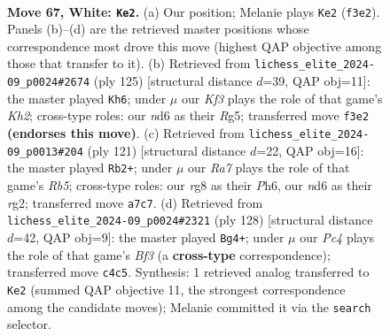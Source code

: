 \documentclass[11pt]{article}
\begin{document}
\clearpage

\begin{figure}[p]\centering
\begin{subfigure}{0.46\textwidth}\centering
\resizebox{\linewidth}{!}{%
\newchessgame
\chessboard[
  setfen={3k2r1/R6p/P2n4/8/2P5/2p2K1P/2P3P1/5B2 w - - 3 67},
  showmover=false,
  pgfstyle=straightmove, color=movearrow, markmove={f3-e2}
]}
\caption{}
\end{subfigure}\hfill
\begin{subfigure}{0.46\textwidth}\centering
\resizebox{\linewidth}{!}{%
\newchessgame
\chessboard[
  setfen={5K2/6pk/5p2/5Prp/1p2R3/1P6/8/8 b - - 0 63},
  showmover=false,
  pgfstyle=straightmove, color=movearrow, markmove={h7-h6}
]}
\caption{}
\end{subfigure}
\\[4pt]
\begin{subfigure}{0.46\textwidth}\centering
\resizebox{\linewidth}{!}{%
\newchessgame
\chessboard[
  setfen={8/8/1k3p1p/1p2bP1P/1r2p3/6p1/2K1N1R1/8 b - - 1 61},
  showmover=false,
  pgfstyle=straightmove, color=movearrow, markmove={b4-b2}
]}
\caption{}
\end{subfigure}\hfill
\begin{subfigure}{0.46\textwidth}\centering
\resizebox{\linewidth}{!}{%
\newchessgame
\chessboard[
  setfen={8/8/3p4/1P1P1kn1/2P4R/5B1p/r7/5K2 w - - 6 65},
  showmover=false,
  pgfstyle=straightmove, color=movearrow, markmove={f3-g4}
]}
\caption{}
\end{subfigure}
\caption{\textbf{Move 67, White: \texttt{Ke2}.} (a) Our position; Melanie plays \texttt{Ke2} (\texttt{f3e2}). Panels (b)--(d) are the retrieved master positions whose correspondence most drove this move (highest QAP objective among those that transfer to it). (b) Retrieved from \texttt{lichess\_elite\_2024-09\_p0024\#2674} (ply 125) [structural distance $d$=39, QAP obj=11]: the master played \texttt{Kh6}; under $\mu$ our \emph{Kf3} plays the role of that game's \emph{Kh2}; cross-type roles: our \emph{n}d6 as their \emph{R}g5; transferred move \texttt{f3e2} \textbf{(endorses this move)}. (c) Retrieved from \texttt{lichess\_elite\_2024-09\_p0013\#204} (ply 121) [structural distance $d$=22, QAP obj=16]: the master played \texttt{Rb2+}; under $\mu$ our \emph{Ra7} plays the role of that game's \emph{Rb5}; cross-type roles: our \emph{r}g8 as their \emph{P}h6, our \emph{n}d6 as their \emph{r}g2; transferred move \texttt{a7c7}. (d) Retrieved from \texttt{lichess\_elite\_2024-09\_p0024\#2321} (ply 128) [structural distance $d$=42, QAP obj=9]: the master played \texttt{Bg4+}; under $\mu$ our \emph{Pc4} plays the role of that game's \emph{Bf3} (a \textbf{cross-type} correspondence); transferred move \texttt{c4c5}. Synthesis: 1 retrieved analog transferred to \texttt{Ke2} (summed QAP objective 11, the strongest correspondence among the candidate moves); Melanie committed it via the \texttt{search} selector.}
\label{fig:thought-m132}
\end{figure}
\end{document}
